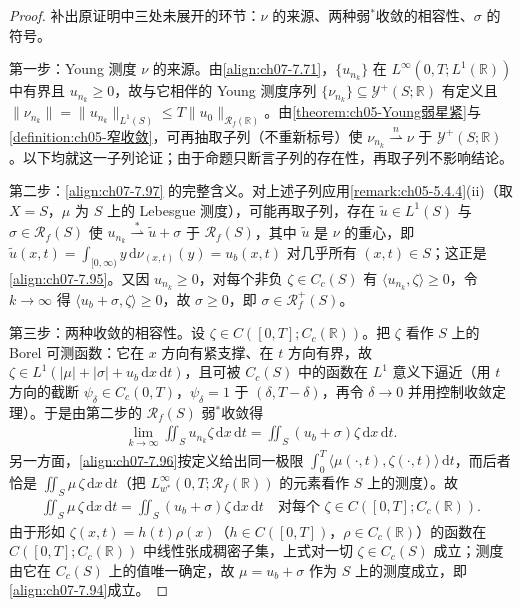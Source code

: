\documentclass[../../main.tex]{subfiles}%
\begin{document}
\begin{proof}
补出原证明中三处未展开的环节：$\nu$ 的来源、两种弱$^*$收敛的相容性、$\sigma$ 的符号。

第一步：Young 测度 $\nu$ 的来源。由\eqref{align:ch07-7.71}，$\{u_{n_k}\}$ 在 $L^\infty(0,T;L^1(\mathbb{R}))$ 中有界且 $u_{n_k}\geqslant0$，故与它相伴的 Young 测度序列 $\{\nu_{n_k}\}\subseteq\mathcal{Y}^+(S;\mathbb{R})$ 有定义且 $\|\nu_{n_k}\|=\|u_{n_k}\|_{L^1(S)}\leqslant T\|u_0\|_{\mathscr{R}_f(\mathbb{R})}$。由\cref{theorem:ch05-Young弱星紧}与\cref{definition:ch05-窄收敛}，可再抽取子列（不重新标号）使 $\nu_{n_k}\stackrel{n}{\rightharpoonup}\nu$ 于 $\mathcal{Y}^+(S;\mathbb{R})$。以下均就这一子列论证；由于命题只断言子列的存在性，再取子列不影响结论。

第二步：\eqref{align:ch07-7.97} 的完整含义。对上述子列应用\cref{remark:ch05-5.4.4}(ii)（取 $X=S$，$\mu$ 为 $S$ 上的 Lebesgue 测度），可能再取子列，存在 $\tilde u\in L^1(S)$ 与 $\sigma\in\mathscr{R}_f(S)$ 使 $u_{n_k}\stackrel{*}{\rightharpoonup}\tilde u+\sigma$ 于 $\mathscr{R}_f(S)$，其中 $\tilde u$ 是 $\nu$ 的重心，即 $\tilde u(x,t)=\int_{[0,\infty)}y\,\mathrm{d}\nu_{(x,t)}(y)=u_b(x,t)$ 对几乎所有 $(x,t)\in S$；这正是\eqref{align:ch07-7.95}。又因 $u_{n_k}\geqslant0$，对每个非负 $\zeta\in C_c(S)$ 有 $\langle u_{n_k},\zeta\rangle\geqslant0$，令 $k\to\infty$ 得 $\langle u_b+\sigma,\zeta\rangle\geqslant0$，故 $\sigma\geqslant0$，即 $\sigma\in\mathscr{R}_f^+(S)$。

第三步：两种收敛的相容性。设 $\zeta\in C([0,T];C_c(\mathbb{R}))$。把 $\zeta$ 看作 $S$ 上的 Borel 可测函数：它在 $x$ 方向有紧支撑、在 $t$ 方向有界，故 $\zeta\in L^1(|\mu|+|\sigma|+u_b\,\mathrm{d}x\,\mathrm{d}t)$，且可被 $C_c(S)$ 中的函数在 $L^1$ 意义下逼近（用 $t$ 方向的截断 $\psi_\delta\in C_c(0,T)$，$\psi_\delta=1$ 于 $(\delta,T-\delta)$，再令 $\delta\to0$ 并用控制收敛定理）。于是由第二步的 $\mathscr{R}_f(S)$ 弱$^*$收敛得
\begin{align*}
\lim_{k\to\infty}\iint_S u_{n_k}\zeta\,\mathrm{d}x\,\mathrm{d}t=\iint_S(u_b+\sigma)\zeta\,\mathrm{d}x\,\mathrm{d}t.
\end{align*}
另一方面，\eqref{align:ch07-7.96}按定义给出同一极限 $\int_0^T\langle\mu(\cdot,t),\zeta(\cdot,t)\rangle\,\mathrm{d}t$，而后者恰是 $\iint_S\mu\,\zeta\,\mathrm{d}x\,\mathrm{d}t$（把 $L^\infty_{w^*}(0,T;\mathscr{R}_f(\mathbb{R}))$ 的元素看作 $S$ 上的测度）。故
\begin{align*}
\iint_S\mu\,\zeta\,\mathrm{d}x\,\mathrm{d}t=\iint_S(u_b+\sigma)\zeta\,\mathrm{d}x\,\mathrm{d}t
\quad\text{对每个 }\zeta\in C([0,T];C_c(\mathbb{R})).
\end{align*}
由于形如 $\zeta(x,t)=h(t)\rho(x)$（$h\in C([0,T])$，$\rho\in C_c(\mathbb{R})$）的函数在 $C([0,T];C_c(\mathbb{R}))$ 中线性张成稠密子集，上式对一切 $\zeta\in C_c(S)$ 成立；测度由它在 $C_c(S)$ 上的值唯一确定，故 $\mu=u_b+\sigma$ 作为 $S$ 上的测度成立，即\eqref{align:ch07-7.94}成立。
\end{proof}
\end{document}
